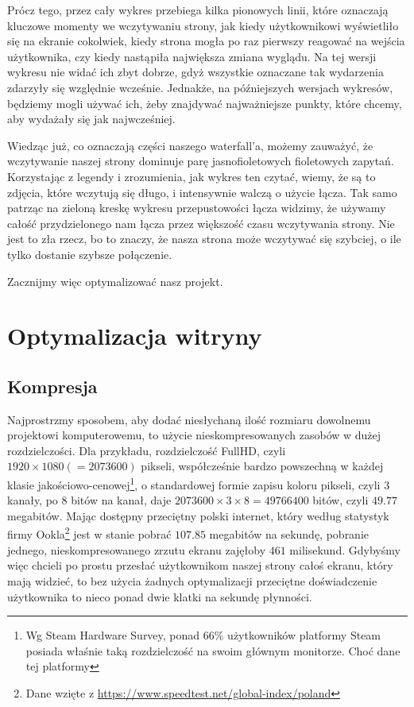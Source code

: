 \documentclass[licencjacka]{pracadypl}
\begin{document}
Prócz tego, przez cały wykres przebiega kilka pionowych linii, które oznaczają kluczowe momenty we wczytywaniu strony, jak kiedy użytkownikowi wyświetliło się na ekranie cokolwiek, kiedy strona mogła po raz pierwszy reagować na wejścia użytkownika, czy kiedy nastąpiła największa zmiana wyglądu. Na tej wersji wykresu nie widać ich zbyt dobrze, gdyż wszystkie oznaczane tak wydarzenia zdarzyły się względnie wcześnie. Jednakże, na późniejszych wersjach wykresów, będziemy mogli używać ich, żeby znajdywać najważniejsze punkty, które chcemy, aby wydażały się jak najwcześniej.

Wiedząc już, co oznaczają części naszego waterfall'a, możemy zauważyć, że wczytywanie naszej strony dominuje parę jasnofioletowych fioletowych zapytań. Korzystając z legendy i zrozumienia, jak wykres ten czytać, wiemy, że są to zdjęcia, które wczytują się długo, i intensywnie walczą o użycie łącza. Tak samo patrząc na zieloną kreskę wykresu przepustowości łącza widzimy, że używamy całość przydzielonego nam łącza przez większość czasu wczytywania strony. Nie jest to zła rzecz, bo to znaczy, że nasza strona może wczytywać się szybciej, o ile tylko dostanie szybsze połączenie.

Zacznijmy więc optymalizować nasz projekt.

\chapter{Optymalizacja witryny}
\section{Kompresja}
Najprostrzmy sposobem, aby dodać niesłychaną ilość rozmiaru dowolnemu projektowi komputerowemu, to użycie nieskompresowanych zasobów w dużej rozdzielczości. Dla przykładu, rozdzielczość FullHD, czyli $1920\times1080\left(=2073600\right)$ pikseli, współcześnie bardzo powszechną w każdej klasie jakościowo-cenowej\footnote{Wg Steam Hardware Survey, ponad 66\% użytkowników platformy Steam posiada właśnie taką rozdzielczość na swoim głównym monitorze. Choć dane tej platformy }, o standardowej formie zapisu koloru pikseli, czyli 3 kanały, po 8 bitów na kanał, daje $2073600\times3\times8 = 49766400$ bitów, czyli $49.77$ megabitów. Mając dostępny przeciętny polski internet, który według statystyk firmy Ookla\footnote{Dane wzięte z \url{https://www.speedtest.net/global-index/poland}} jest w stanie pobrać $107.85$ megabitów na sekundę, pobranie jednego, nieskompresowanego zrzutu ekranu zajęłoby $461$ milisekund. Gdybyśmy więc chcieli po prostu przesłać użytkownikom naszej strony całoś ekranu, który mają widzieć, to bez użycia żadnych optymalizacji przeciętne doświadczenie użytkownika to nieco ponad dwie klatki na sekundę płynności.
\end{document}
